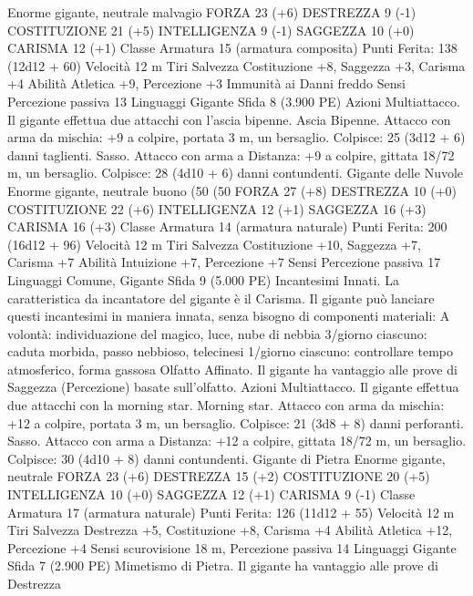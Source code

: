 \begin{multicols}{2}
Enorme gigante, neutrale malvagio
FORZA 23 (+6)
DESTREZZA 9 (-1)
COSTITUZIONE 21 (+5)
INTELLIGENZA 9 (-1)
SAGGEZZA 10 (+0)
CARISMA 12 (+1)
Classe Armatura 15 (armatura composita)
\hspace*{0pt}\hfill{Punti Ferita}: 138 (12d12 + 60)
Velocità 12 m
Tiri Salvezza Costituzione +8, Saggezza +3, Carisma +4
Abilità Atletica +9, Percezione +3
Immunità ai Danni freddo
Sensi Percezione passiva 13
Linguaggi Gigante
Sfida 8 (3.900 PE)
Azioni
Multiattacco. Il gigante effettua due attacchi con l’ascia bipenne.
Ascia Bipenne. Attacco con arma da mischia: +9 a colpire,
portata 3 m, un bersaglio.
Colpisce: 25 (3d12 + 6) danni taglienti.
Sasso. Attacco con arma a Distanza: +9 a colpire, gittata 18/72
m, un bersaglio.
Colpisce: 28 (4d10 + 6) danni contundenti.
Gigante delle Nuvole
Enorme gigante, neutrale buono (50%
(50%
FORZA 27 (+8)
DESTREZZA 10 (+0)
COSTITUZIONE 22 (+6)
INTELLIGENZA 12 (+1)
SAGGEZZA 16 (+3)
CARISMA 16 (+3)
Classe Armatura 14 (armatura naturale)
\hspace*{0pt}\hfill{Punti Ferita}: 200 (16d12 + 96)
Velocità 12 m
Tiri Salvezza Costituzione +10, Saggezza +7, Carisma +7
Abilità Intuizione +7, Percezione +7
Sensi Percezione passiva 17
Linguaggi Comune, Gigante
Sfida 9 (5.000 PE)
Incantesimi Innati. La caratteristica da incantatore del gigante è
il Carisma. Il gigante può lanciare questi incantesimi in maniera
innata, senza bisogno di componenti materiali:
A volontà: individuazione del magico, luce, nube di nebbia
3/giorno ciascuno: caduta morbida, passo nebbioso, telecinesi
1/giorno ciascuno: controllare tempo atmosferico, forma gassosa
Olfatto Affinato. Il gigante ha vantaggio alle prove di Saggezza
(Percezione) basate sull’olfatto.
Azioni
Multiattacco. Il gigante effettua due attacchi con la morning star.
Morning star. Attacco con arma da mischia: +12 a colpire,
portata 3 m, un bersaglio.
Colpisce: 21 (3d8 + 8) danni perforanti.
Sasso. Attacco con arma a Distanza: +12 a colpire, gittata 18/72
m, un bersaglio.
Colpisce: 30 (4d10 + 8) danni contundenti. 
Gigante di Pietra
Enorme gigante, neutrale
FORZA 23 (+6)
DESTREZZA 15 (+2)
COSTITUZIONE 20 (+5)
INTELLIGENZA 10 (+0)
SAGGEZZA 12 (+1)
CARISMA 9 (-1)
Classe Armatura 17 (armatura naturale)
\hspace*{0pt}\hfill{Punti Ferita}: 126 (11d12 + 55)
Velocità 12 m
Tiri Salvezza Destrezza +5, Costituzione +8, Carisma +4
Abilità Atletica +12, Percezione +4
Sensi scurovisione 18 m, Percezione passiva 14
Linguaggi Gigante
Sfida 7 (2.900 PE)
Mimetismo di Pietra. Il gigante ha vantaggio alle prove di Destrezza

\end{multicols}
